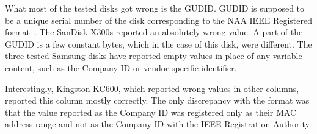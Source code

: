 What most of the tested disks got wrong is the GUDID. GUDID is supposed to be a unique serial number of the disk corresponding to the NAA IEEE Registered format~\cite{spc-4}.
The SanDisk X300s reported an absolutely wrong value. A part of the GUDID is a few constant bytes, which in the case of this disk, were different.
The three tested Samsung disks have reported empty values in place of any variable content, such as the Company ID or vendor-specific identifier.

Interestingly, Kingston KC600, which reported wrong values in other columns, reported this column mostly correctly. The only discrepancy with the format was that the value reported as the Company ID was registered only as their MAC address range and not as the Company ID with the IEEE Registration Authority.






